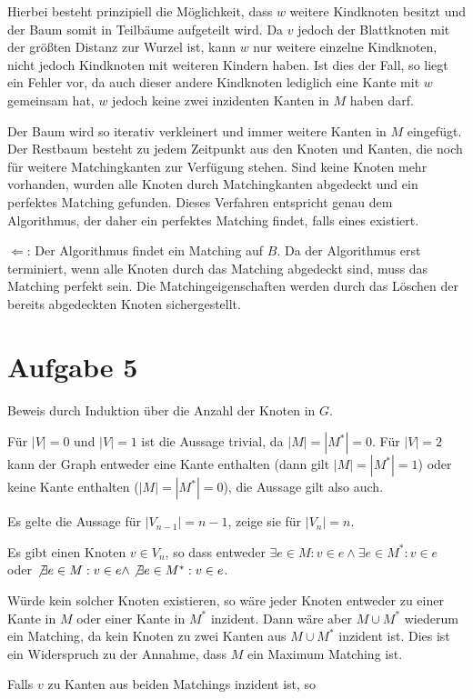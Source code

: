 \documentclass[a4paper]{article}
\begin{document}
Hierbei besteht prinzipiell die Möglichkeit, dass $w$ weitere Kindknoten
besitzt und der Baum somit in Teilbäume aufgeteilt wird. Da $v$ jedoch der
Blattknoten mit der größten Distanz zur Wurzel ist, kann $w$ nur weitere
einzelne Kindknoten, nicht jedoch Kindknoten mit weiteren Kindern haben.
Ist dies der Fall, so liegt ein Fehler vor, da auch dieser andere Kindknoten
lediglich eine Kante mit $w$ gemeinsam hat, $w$ jedoch keine zwei inzidenten
Kanten in $M$ haben darf.

Der Baum wird so iterativ verkleinert und immer weitere Kanten in $M$
eingefügt. Der Restbaum besteht zu jedem Zeitpunkt aus den Knoten und
Kanten, die noch für weitere Matchingkanten zur Verfügung stehen.
Sind keine Knoten mehr vorhanden, wurden alle Knoten durch Matchingkanten
abgedeckt und ein perfektes Matching gefunden.
Dieses Verfahren entspricht genau dem Algorithmus, der daher ein perfektes
Matching findet, falls eines existiert.

$\Leftarrow$: Der Algorithmus findet ein Matching auf $B$. Da der
Algorithmus erst terminiert, wenn alle Knoten durch das Matching abgedeckt
sind, muss das Matching perfekt sein. Die Matchingeigenschaften werden durch
das Löschen der bereits abgedeckten Knoten sichergestellt.

\section{Aufgabe 5}
Beweis durch Induktion über die Anzahl der Knoten in $G$.

Für $|V| = 0$ und $|V| = 1$ ist die Aussage trivial, da $|M| = |M^*| = 0$.
Für $|V| = 2$ kann der Graph entweder eine Kante enthalten (dann gilt $|M| =
|M^*| = 1$) oder keine Kante enthalten ($|M| = |M^*| = 0$), die Aussage gilt
also auch.

Es gelte die Aussage für $|V_{n-1}| = n-1$, zeige sie für $|V_n| = n$.

Es gibt einen Knoten $v \in V_n$, so dass entweder $\exists e \in M: v \in e
\wedge \exists e \in M^*: v \in e$ oder $\not\exists e \in M: v \in e \wedge \not\exists e \in
M^*: v \in e$.

Würde kein solcher Knoten existieren, so wäre jeder Knoten entweder zu einer
Kante in $M$ oder einer Kante in $M^*$ inzident. Dann wäre aber $M \cup M^*$
wiederum ein Matching, da kein Knoten zu zwei Kanten aus $M \cup M^*$
inzident ist. Dies ist ein Widerspruch zu der Annahme, dass $M$ ein Maximum
Matching ist.

Falls $v$ zu Kanten aus beiden Matchings inzident ist, so 
\end{document}
